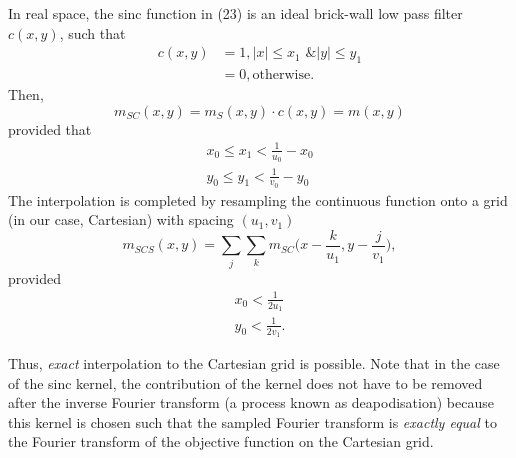 \documentclass[11pt]{article}
\begin{document}
In real space, the sinc function in (23) is an ideal brick-wall low pass filter $c(x,y)$, such that
\begin{align}
c(x,y) &= 1, |x| \leq x_1 \text{ \& } |y| \leq y_1 \\
&= 0, \text{otherwise}.
\end{align}
Then, 
\begin{equation}
m_{SC}(x,y) = m_{S}(x,y) \cdot c(x,y) = m(x,y)
\end{equation}
provided that
\begin{align}
x_0 \leq x_1 < \frac{1}{u_0} - x_0 \\
y_0 \leq y_1 < \frac{1}{v_0} - y_0
\end{align}
The interpolation is completed by resampling the continuous function onto a grid (in our case, Cartesian) with spacing $(u_1, v_1)$
\begin{equation}
m_{SCS}(x,y)=\sum_j \sum_k m_{SC}\Big(x - \frac{k}{u_1}, y - \frac{j}{v_1}\Big),
\end{equation}
provided \begin{align}
x_0 < \frac{1}{2u_1}\\
y_0 < \frac{1}{2v_1}.
\end{align}

Thus, \emph{exact} interpolation to the Cartesian grid is possible. Note that in the case of the sinc kernel, the contribution of the kernel does not have to be removed after the inverse Fourier transform (a process known as deapodisation) because this kernel is chosen such that the sampled Fourier transform is \emph{exactly equal} to the Fourier transform of the objective function on the Cartesian grid.
\end{document}
